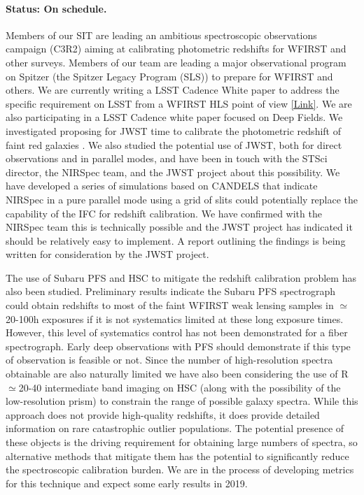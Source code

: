 \paragraph*{Status: On schedule.} Members of our SIT are leading an ambitious spectroscopic observations campaign (C3R2) aiming at calibrating photometric redshifts
for WFIRST and other surveys. Members of our team are leading a major
observational program on Spitzer (the Spitzer Legacy Program (SLS)) to prepare for WFIRST and others. We are currently writing a LSST Cadence White paper to address the specific requirement on LSST from a WFIRST HLS point of view  \href{https://www.lsst.org/call-whitepaper-2018}{[Link]}. We are also participating in a LSST Cadence white paper focused on Deep Fields. We investigated proposing for JWST time to calibrate the photometric redshift of faint red galaxies \citep{Hemmati:2018}. We also studied the potential use of JWST, both for direct observations and in parallel modes, and have been in touch with the STSci director, the NIRSpec team,  and the JWST project about this possibility.  We have developed a series of simulations based on CANDELS that indicate NIRSpec in a pure parallel mode using a grid of slits could potentially replace the capability of the IFC for redshift calibration.  We have confirmed with the NIRSpec team this is technically possible and the JWST project has indicated it should be relatively easy to implement.  A report outlining the findings is being written for consideration by the JWST project.

The use of Subaru PFS and HSC to mitigate the redshift calibration problem has
also been studied.  Preliminary results indicate the Subaru PFS spectrograph
could obtain redshifts to most of the faint WFIRST weak lensing samples in
$\simeq$20-100h exposures if it is not systematics limited at these long
exposure times.  However, this level of systematics control has not been
demonstrated for a fiber spectrograph.  Early deep observations with PFS should
demonstrate if this type of observation is feasible or not.  Since the number of
high-resolution spectra obtainable are also naturally limited we have also been
considering the use of R$\simeq$20-40 intermediate band imaging on HSC (along with the
possibility of the low-resolution prism) to constrain the range of possible
galaxy spectra.  While this approach does not provide high-quality redshifts, it
does provide detailed information on rare catastrophic outlier populations.  The
potential presence of these objects is the driving requirement for obtaining
large numbers of spectra, so alternative methods that mitigate them has the
potential to significantly reduce the spectroscopic calibration burden.  We are
in the process of developing metrics for this technique and expect some early
results in 2019.

